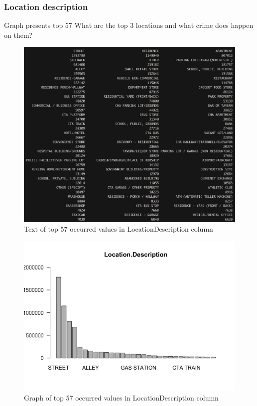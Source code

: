 \newpage
\subsubsection{Location description}
Graph presents top 57
What are the top 3 locations and what crime does happen on them?
\begin{figure}[H]
\includegraphics[scale=0.45]{images/EDA/LocationDescription.jpg}
\centering
\caption{Text of top 57 occurred values in LocationDescription column}
\end{figure}
\begin{figure}[H]
\includegraphics[scale=0.7]{images/EDA/LocationDescription.png}
\centering
\caption{Graph of top 57 occurred values in LocationDescription column}
\end{figure}